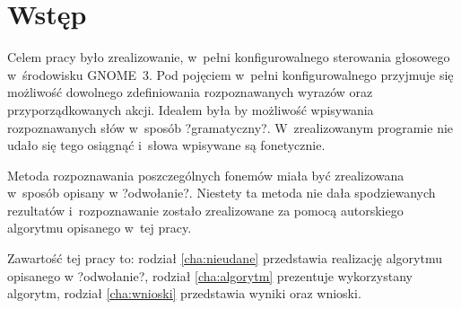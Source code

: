 \chapter{Wstęp}
\label{cha:wstep}

Celem pracy było zrealizowanie, w~pełni konfigurowalnego sterowania głosowego w~środowisku GNOME~3. Pod pojęciem w~pełni konfigurowalnego przyjmuje się możliwość dowolnego zdefiniowania rozpoznawanych wyrazów oraz przyporządkowanych akcji. Ideałem była by możliwość wpisywania rozpoznawanych słów w~sposób ?gramatyczny?. W~zrealizowanym programie nie udało się tego osiągnąć i~słowa wpisywane są fonetycznie.

Metoda rozpoznawania poszczególnych fonemów miała być zrealizowana w~sposób opisany w ?odwołanie?. Niestety ta metoda nie dała spodziewanych rezultatów i~rozpoznawanie zostało zrealizowane za pomocą autorskiego algorytmu opisanego w~tej pracy.

Zawartość tej pracy to: rodział \ref{cha:nieudane} przedstawia realizację algorytmu opisanego w ?odwołanie?, rodział \ref{cha:algorytm} prezentuje wykorzystany algorytm, rodział \ref{cha:wnioski} przedstawia wyniki oraz wnioski.
